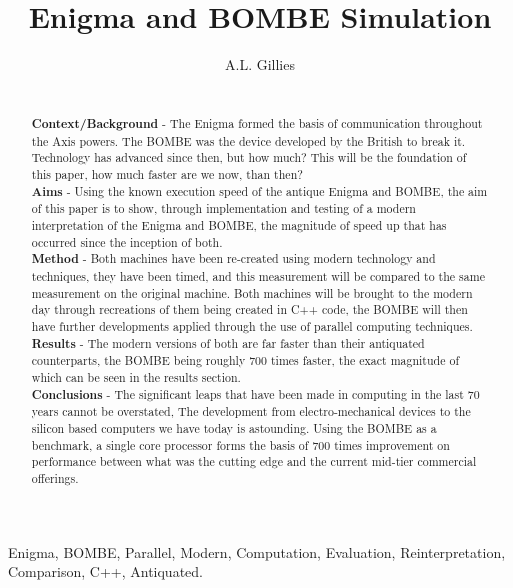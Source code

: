 \documentclass[12pt,a4paper]{article}
\title{Enigma and BOMBE Simulation}
\author{A.L. Gillies}
\date{}
\begin{document}
\maketitle

\begin{abstract}\\

{\bf Context/Background} - The Enigma formed the basis of communication throughout the Axis powers. The BOMBE was the device developed by the British to break it.  Technology has advanced since then, but how much? This will be the foundation of this paper, how much faster are we now, than then?\\

{\bf Aims} - Using the known execution speed of the antique Enigma and BOMBE, the aim of this paper is to show, through implementation and testing of a modern interpretation of the Enigma and BOMBE, the magnitude of speed up that has occurred since the inception of both.\\

{\bf Method} - Both machines have been re-created using modern technology and techniques, they have been timed, and this measurement will be compared to the same measurement on the original machine. Both machines will be brought to the modern day through recreations of them being created in C++ code, the BOMBE will then have further developments applied through the use of parallel computing techniques.\\

{\bf Results} - The modern versions of both are far faster than their antiquated counterparts, the BOMBE being roughly 700 times faster, the exact magnitude of which can be seen in the results section.\\

{\bf Conclusions} - The significant leaps that have been made in computing in the last 70 years cannot be overstated, The development from electro-mechanical devices to the silicon based computers we have today is astounding. Using the BOMBE as a benchmark, a single core processor forms the basis of 700 times improvement on performance between what was the cutting edge and the current mid-tier commercial offerings.
\end{abstract}

\begin{keywords}
Enigma, BOMBE, Parallel, Modern, Computation, Evaluation, Reinterpretation, Comparison, C++, Antiquated.
\end{keywords}
\end{document}
